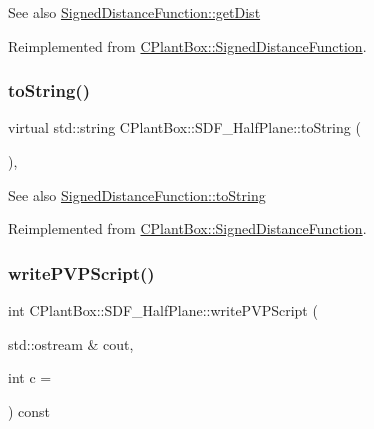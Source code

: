 \begin{DoxySeeAlso}{See also}
\hyperlink{classCPlantBox_1_1SignedDistanceFunction_a8e58237574af3673906bba84d5d14ee8}{Signed\+Distance\+Function\+::get\+Dist} 
\end{DoxySeeAlso}


Reimplemented from \hyperlink{classCPlantBox_1_1SignedDistanceFunction_a8e58237574af3673906bba84d5d14ee8}{C\+Plant\+Box\+::\+Signed\+Distance\+Function}.

\mbox{\label{classCPlantBox_1_1SDF__HalfPlane_afcf91da28b3743f4b701605181564aa6}} 
\subsubsection{\texorpdfstring{to\+String()}{toString()}}
{\footnotesize\ttfamily virtual std\+::string C\+Plant\+Box\+::\+S\+D\+F\+\_\+\+Half\+Plane\+::to\+String (\begin{DoxyParamCaption}{ }\end{DoxyParamCaption})\hspace{0.3cm}{\ttfamily [inline]}, {\ttfamily [virtual]}}

\begin{DoxySeeAlso}{See also}
\hyperlink{classCPlantBox_1_1SignedDistanceFunction_a9f375961d9a24b06dc669ac67aa16fa6}{Signed\+Distance\+Function\+::to\+String} 
\end{DoxySeeAlso}


Reimplemented from \hyperlink{classCPlantBox_1_1SignedDistanceFunction_a9f375961d9a24b06dc669ac67aa16fa6}{C\+Plant\+Box\+::\+Signed\+Distance\+Function}.

\mbox{\label{classCPlantBox_1_1SDF__HalfPlane_aa635bfdd7990a3369c7ef5c9c9e627a2}} 
\subsubsection{\texorpdfstring{write\+P\+V\+P\+Script()}{writePVPScript()}}
{\footnotesize\ttfamily int C\+Plant\+Box\+::\+S\+D\+F\+\_\+\+Half\+Plane\+::write\+P\+V\+P\+Script (\begin{DoxyParamCaption}\item[{std\+::ostream \&}]{cout,  }\item[{int}]{c = {} }\end{DoxyParamCaption}) const\hspace{0.3cm}{\ttfamily [virtual]}}

